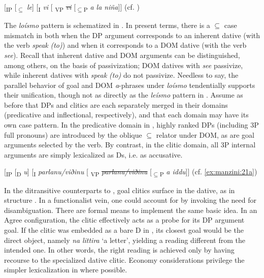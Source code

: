\documentclass[output=paper,colorlinks,citecolor=brown,modfonts,nonflat]{langsci/langscibook}
\begin{document}
\newpage

\ea%
    \label{ex:manzini:25}{}
    [\textsubscript{IP} [\textsubscript{${\subseteq}$} \textit{le}]  [\textsubscript{I} \textit{vi}   [\textsubscript{ VP} \sout{\textit{vi}}  [\textsubscript{${\subseteq}$P} \textit{a la niña}]]    \hfill (cf. )\\
\z

The \textit{loísmo} pattern is schematized in . In present terms, there is a ${\subseteq}$ case mismatch in  both when the DP argument corresponds to an inherent dative (with the verb \textit{speak} \textit{(to)}) and when it corresponds to a DOM dative (with the verb \textit{see}). Recall that inherent dative and DOM arguments can be distinguished, among others, on the basis of passivization; DOM datives with \textit{see} passivize, while inherent datives with \textit{speak} \textit{(to)} do not passivize. Needless to say, the parallel behavior of goal and DOM \textit{a}-phrases under \textit{loísmo} tendentially supports their unification, though not as directly as the \textit{leísmo} pattern in . Assume as before that DPs and clitics are each separately merged in their domains (predicative and inflectional, respectively), and that each domain may have its own case pattern. In the predicative domain in , highly ranked DPs (including 3P full pronouns) are introduced by the oblique ${\subseteq}$ relator under DOM, as are goal arguments selected by the verb. By contrast, in the clitic domain, all 3P internal arguments are simply lexicalized as Ds, i.e. as accusative.

\ea%
    \label{ex:manzini:26}{}
    [\textsubscript{IP} [\textsubscript{D} \textit{u}] [\textsubscript{I} \textit{parlanu/viðinu}   [\textsubscript{ VP} \sout{\textit{parlanu/viðinu}} [\textsubscript{${\subseteq}$P} \textit{a iddu}]]              \hfill (cf. \ref{ex:manzini:21a})
\z

In the ditransitive counterparts to , goal clitics surface in the dative, as in structure . In a functionalist vein, one could account for  by invoking the need for disambiguation. There are formal means to implement the same basic idea. In an Agree configuration, the clitic effectively acts as a probe for its DP argument goal. If the clitic was embedded as a bare D in , its closest goal would be the direct object, namely \textit{na} \textit{littira} ‘a letter’, yielding a reading different from the intended one. In other words, the right reading is achieved only by having recourse to the specialized dative clitic. Economy considerations privilege the simpler lexicalization in  where possible.
\end{document}
